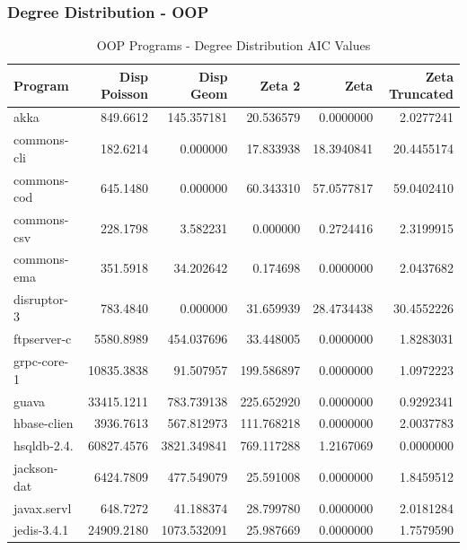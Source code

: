 \documentclass[12pt, a4paper]{article}
\begin{document}
\subsubsection{Degree Distribution - OOP}
\begin{longtable}[H]{l r r r r r}
    \caption{OOP Programs - Degree Distribution AIC Values}\label{table:oop_deg_dist_aic}\\
        Program & Disp Poisson & Disp Geom & Zeta 2 & Zeta & Zeta Truncated \\
        \hline            
        \endhead  
        akka         &   849.6612 &   145.357181             &  20.536579 &   0.0000000 &   2.0277241 \\
        commons-cli  &   182.6214 &     0.000000             &  17.833938 &  18.3940841 &  20.4455174 \\
        commons-cod  &   645.1480 &     0.000000             &  60.343310 &  57.0577817 &  59.0402410 \\
        commons-csv  &   228.1798 &     3.582231             &   0.000000 &   0.2724416 &   2.3199915 \\
        commons-ema  &   351.5918 &    34.202642             &   0.174698 &   0.0000000 &   2.0437682 \\
        disruptor-3  &   783.4840 &     0.000000             &  31.659939 &  28.4734438 &  30.4552226 \\
        ftpserver-c  &  5580.8989 &   454.037696             &  33.448005 &   0.0000000 &   1.8283031 \\
        grpc-core-1  & 10835.3838 &    91.507957             & 199.586897 &   0.0000000 &   1.0972223 \\
        guava        & 33415.1211 &   783.739138             & 225.652920 &   0.0000000 &   0.9292341 \\
        hbase-clien  &  3936.7613 &   567.812973             & 111.768218 &   0.0000000 &   2.0037783 \\
        hsqldb-2.4.  & 60827.4576 &  3821.349841             & 769.117288 &   1.2167069 &   0.0000000 \\
        jackson-dat  &  6424.7809 &   477.549079             &  25.591008 &   0.0000000 &   1.8459512 \\
        javax.servl  &   648.7272 &    41.188374             &  28.799780 &   0.0000000 &   2.0181284 \\
        jedis-3.4.1  & 24909.2180 &  1073.532091             &  25.987669 &   0.0000000 &   1.7579590 \\

\end{longtable}
\end{document}
